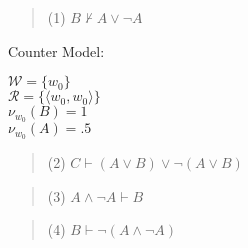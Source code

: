 \begin{quote} 
(1) $ B\nvdash  A \vee  \neg A $
\end{quote} 
\bigskip


\bigskip

Counter Model: 

\bigskip
\noindent $\mathcal{W} = \{ w_0\} $\\
$\mathcal{R} = \{ \langle w_0,w_0 \rangle \} $\\
$ \mathcal{\nu}_{w_0}(B)=1 $ \\
$ \mathcal{\nu}_{w_0}(A)=.5 $ \\
\bigskip




\begin{quote} 
(2) $ C\vdash  (A \vee  B) \vee  \neg (A \vee  B) $
\end{quote} 
\bigskip



\begin{quote} 
(3) $ A \wedge  \neg A\vdash  B $
\end{quote} 
\bigskip



\begin{quote} 
(4) $ B\vdash  \neg (A \wedge  \neg A) $
\end{quote} 
\bigskip

